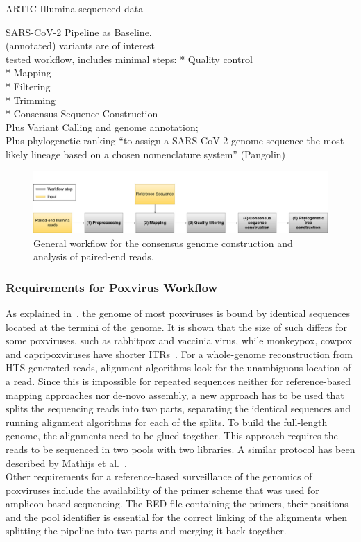 ARTIC Illumina-sequenced data

\ac{SARS-CoV-2} Pipeline as Baseline. \\
(annotated) variants are of interest \\

tested workflow, includes minimal steps: 
* Quality control \\
* Mapping \\
* Filtering \\
* Trimming \\
* Consensus Sequence Construction \\

Plus Variant Calling and genome annotation; \\
Plus phylogenetic ranking ``to assign a \ac{SARS-CoV-2} genome sequence the most likely lineage based on a chosen nomenclature system'' (Pangolin)

\begin{figure}[H]
	\centering
	\includegraphics[width=1\textwidth]{media/general.jpg}
	\caption{General workflow for the consensus genome construction and analysis of paired-end reads.} 
	\label{fig:3-general-wf}
\end{figure}

\subsubsection{Requirements for Poxvirus Workflow}
As explained in~, the genome of most poxviruses is bound by identical sequences located at the termini of the genome. It is shown that the size of such differs for some poxviruses, such as rabbitpox and vaccinia virus, while monkeypox, cowpox and capripoxviruses have shorter \acp{ITR}~\cite{wittek1978inverted}. For a whole-genome reconstruction from \ac{HTS}-generated reads, alignment algorithms look for the unambiguous location of a read. Since this is impossible for repeated sequences neither for reference-based mapping approaches nor de-novo assembly, a new approach has to be used that splits the sequencing reads into two parts, separating the identical sequences and running alignment algorithms for each of the splits. To build the full-length genome, the alignments need to be glued together. This approach requires the reads to be sequenced in two pools with two libraries. A similar protocol has been described by Mathijs et al.~\cite{mathijs2022robust}. \\
Other requirements for a reference-based surveillance of the genomics of poxviruses include the availability of the primer scheme that was used for amplicon-based sequencing. The \ac{BED} file containing the primers, their positions and the pool identifier is essential for the correct linking of the alignments when splitting the pipeline into two parts and merging it back together.

